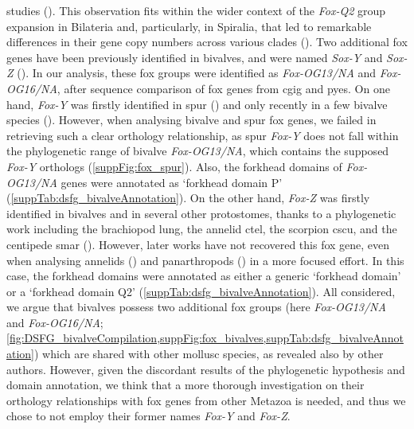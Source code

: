 studies (\textbf{\cite{yang2014phylogeny, wu2020identification}}). This observation fits within the wider context of the \textit{Fox-Q2} group expansion in Bilateria and, particularly, in Spiralia, that led to remarkable differences in their gene copy numbers across various clades (\textbf{\cite{seudre2022fox}}). Two additional \gls{fox} genes have been previously identified in bivalves, and were named \textit{Sox-Y} and \textit{Sox-Z} (\textbf{\cite{yang2014phylogeny, wu2020identification}}). In our analysis, these \gls{fox} groups were identified as \textit{Fox-OG13/NA} and \textit{Fox-OG16/NA}, after sequence comparison of \gls{fox} genes from \gls{cgig} and \gls{pyes}. On one hand, \textit{Fox-Y} was firstly identified in \gls{spur} (\textbf{\cite{tu2006sea}}) and only recently in a few bivalve species (\textbf{\cite{yang2014phylogeny, wu2020identification}}). However, when analysing bivalve and \gls{spur} \gls{fox} genes, we failed in retrieving such a clear orthology relationship, as \gls{spur} \textit{Fox-Y} does not fall within the phylogenetic range of bivalve \textit{Fox-OG13/NA}, which contains the supposed \textit{Fox-Y} orthologs (\cref{suppFig:fox_spur}). Also, the forkhead domains of \textit{Fox-OG13/NA} genes were annotated as ‘forkhead domain P’ (\cref{suppTab:dsfg_bivalveAnnotation}). On the other hand, \textit{Fox-Z} was firstly identified in bivalves and in several other protostomes, thanks to a phylogenetic work including the brachiopod \gls{lung}, the annelid \gls{ctel}, the scorpion \gls{cscu}, and the centipede \gls{smar} (\textbf{\cite{wu2020identification}}). However, later works have not recovered this \gls{fox} gene, even when analysing annelids (\textbf{\cite{seudre2022fox}}) and panarthropods (\textbf{\cite{schomburg2022phylogenetic}}) in a more focused effort. In this case, the forkhead domains were annotated as either a generic ‘forkhead domain’ or a ‘forkhead domain Q2’ (\cref{suppTab:dsfg_bivalveAnnotation}). All considered, we argue that bivalves possess two additional \gls{fox} groups (here \textit{Fox-OG13/NA} and \textit{Fox-OG16/NA}; \cref{fig:DSFG_bivalveCompilation,suppFig:fox_bivalves,suppTab:dsfg_bivalveAnnotation}) which are shared with other mollusc species, as revealed also by other authors. However, given the discordant results of the phylogenetic hypothesis and domain annotation, we think that a more thorough investigation on their orthology relationships with \gls{fox} genes from other Metazoa is needed, and thus we chose to not employ their former names \textit{Fox-Y} and \textit{Fox-Z}.

